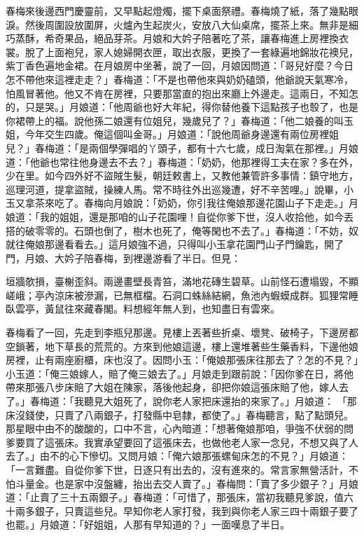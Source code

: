 春梅來後邊西門慶靈前，又早點起燈燭，擺下桌面祭禮。春梅燒了紙，落了幾點眼淚。然後周圍設放圍屏，火爐內生起炭火，安放八大仙桌席，擺茶上來。無非是細巧蒸酥，希奇果品，絕品芽茶。月娘和大妗子陪著吃了茶，讓春梅進上房裡換衣裳。脫了上面袍兒，家人媳婦開衣匣，取出衣服，更換了一套綠遍地錦妝花襖兒，紫丁香色遍地金裙。在月娘房中坐著，說了一回，月娘因問道：「哥兒好麼？今日怎不帶他來這裡走走？」春梅道：「不是也帶他來與奶奶磕頭，他爺說天氣寒冷，怕風冒著他。他又不肯在房裡，只要那當直的抱出來廳上外邊走。這兩日，不知怎的，只是哭。」月娘道：「他周爺也好大年紀，得你替他養下這點孩子也彀了，也是你裙帶上的福。說他孫二娘還有位姐兒，幾歲兒了？」春梅道：「他二娘養的叫玉姐，今年交生四歲。俺這個叫金哥。」月娘道：「說他周爺身邊還有兩位房裡姐兒？」春梅道：「是兩個學彈唱的丫頭子，都有十六七歲，成日淘氣在那裡。」月娘道：「他爺也常往他身邊去不去？」春梅道：「奶奶，他那裡得工夫在家？多在外，少在里。如今四外好不盜賊生髮，朝廷敕書上，又教他兼管許多事情：鎮守地方，巡理河道，提拿盜賊，操練人馬。常不時往外出巡幾遭，好不辛苦哩。」說畢，小玉又拿茶來吃了。春梅向月娘說：「奶奶，你引我往俺娘那邊花園山子下走走。」月娘道：「我的姐姐，還是那咱的山子花園哩！自從你爹下世，沒人收拾他，如今丟搭的破零零的。石頭也倒了，樹木也死了，俺等閑也不去了。」春梅道：「不妨，奴就往俺娘那邊看看去。」這月娘強不過，只得叫小玉拿花園門山子門鑰匙，開了門，月娘、大妗子陪春梅，到裡邊游看了半日。但見：

垣牆欹損，臺榭歪斜。兩邊畫壁長青笞，滿地花磚生碧草。山前怪石遭塌毀，不顯嵯峨；亭內涼床被滲漏，已無框檔。石洞口蛛絲結網，魚池內蝦蟆成群。狐狸常睡臥雲亭，黃鼠往來藏春閣。料想經年無人到，也知盡日有雲來。

春梅看了一回，先走到李瓶兒那邊。見樓上丟著些折桌、壞凳、破椅子，下邊房都空鎖著，地下草長的荒荒的。方來到他娘這邊，樓上還堆著些生藥香料，下邊他娘房裡，止有兩座廚櫃，床也沒了。因問小玉：「俺娘那張床往那去了？怎的不見？」小玉道：「俺三娘嫁人，賠了俺三娘去了。」月娘走到跟前說：「因你爹在日，將他帶來那張八步床賠了大姐在陳家，落後他起身，卻把你娘這張床賠了他，嫁人去了。」春梅道：「我聽見大姐死了，說你老人家把床還抬的來家了。」月娘道： 「那床沒錢使，只賣了八兩銀子，打發縣中皂隸，都使了。」春梅聽言，點了點頭兒。那星眼中由不的酸酸的，口中不言，心內暗道：「想著俺娘那咱，爭強不伏弱的問爹要買了這張床。我實承望要回了這張床去，也做他老人家一念兒，不想又與了人去了。」由不的心下慘切。又問月娘：「俺六娘那張螺甸床怎的不見？」月娘道：「一言難盡。自從你爹下世，日逐只有出去的，沒有進來的。常言家無營活計，不怕斗量金。也是家中沒盤纏，抬出去交人賣了。」春梅問：「賣了多少銀子？」月娘道：「止賣了三十五兩銀子。」春梅道：「可惜了，那張床，當初我聽見爹說，值六十兩多銀子，只賣這些兒。早知你老人家打發，我到與你老人家三四十兩銀子要了也罷。」月娘道：「好姐姐，人那有早知道的？」一面嘆息了半日。

